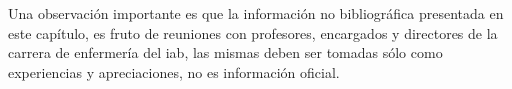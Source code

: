 Una observación importante es que la información no bibliográfica presentada 
en este capítulo, es fruto de reuniones con profesores, encargados y directores 
de la carrera de enfermería del \Gls{iab}, las mismas deben ser tomadas sólo 
como experiencias y apreciaciones, no es información oficial. 




